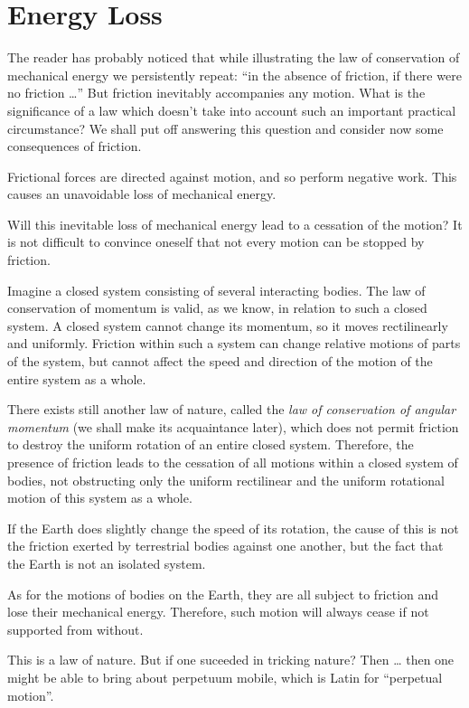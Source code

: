 \section{Energy Loss}

The reader has probably noticed that while illustrating
the law of conservation of mechanical energy we persistently repeat: ``in the absence of friction, if there were
no friction \ldots'' But friction inevitably accompanies any
motion. What is the significance of a law which doesn't
take into account such an important practical circumstance? We shall put off answering this question and consider now some consequences of friction.

Frictional forces are directed against motion, and so
perform negative work. This causes an unavoidable loss
of mechanical energy.

Will this inevitable loss of mechanical energy lead to
a cessation of the motion? It is not difficult to convince
oneself that not every motion can be stopped by friction.

Imagine a closed system consisting of several interacting bodies. The law of conservation of momentum is
valid, as we know, in relation to such a closed system. A
closed system cannot change its momentum, so it moves
rectilinearly and uniformly. Friction within such a system can change relative motions of parts of the system,
but cannot affect the speed and direction of the motion
of the entire system as a whole.

There exists still another law of nature, called the \emph{law
of conservation of angular momentum} (we shall make its
acquaintance later), which does not permit friction to
destroy the uniform rotation of an entire closed system.
Therefore, the presence of friction leads to the cessation of all motions within a closed system of bodies, not
obstructing only the uniform rectilinear and the uniform
rotational motion of this system as a whole.

If the Earth does slightly change the speed of its rotation, the cause of this is not the friction exerted by terrestrial bodies against one another, but the fact that the Earth is not an isolated system.

As for the motions of bodies on the Earth, they are
all subject to friction and lose their mechanical energy.
Therefore, such motion will always cease if not supported
from without.

This is a law of nature. But if one suceeded in tricking
nature? Then \ldots{} then one might be able to bring about
perpetuum mobile, which is Latin for ``perpetual motion''.

